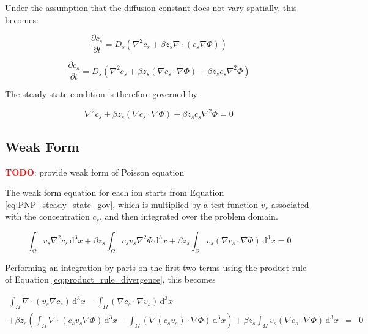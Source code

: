 Under the assumption that the diffusion constant does not vary spatially,
this becomes:

\begin{equation}
\frac{\partial c_s}{\partial t} = 
D_s \left( \nabla^2 c_s + \beta z_s \nabla \cdot \left( c_s \nabla \Phi \right) \right)
\end{equation}

\begin{equation}
\frac{\partial c_s}{\partial t} = 
D_s \left( \nabla^2 c_s + \beta z_s \left( \nabla c_s \cdot \nabla \Phi \right)  + \beta z_s c_s \nabla^2 \Phi \right)
\end{equation}

The steady-state condition is therefore governed by

\begin{equation}\label{eq:PNP_steady_state_gov}
\nabla^2 c_s + \beta z_s \left( \nabla c_s \cdot \nabla \Phi \right)  + \beta z_s c_s \nabla^2 \Phi = 0
\end{equation}


\subsection{Weak Form}\label{subsec:unhom_pnp_weak}

\textcolor{red}{\textbf{TODO}}: provide weak form of Poisson equation

The weak form equation for each ion starts from Equation \ref{eq:PNP_steady_state_gov},
which is multiplied by a test function $v_s$ associated with the concentration $c_s$,
and then integrated over the problem domain.

\begin{equation}
\int_\Omega v_s \nabla^2 c_s \,\mathrm{d}^3x 
+ \beta z_s \int_\Omega c_s v_s \nabla^2 \Phi \,\mathrm{d}^3x
+ \beta z_s \int_\Omega  v_s \left( \nabla c_s \cdot \nabla \Phi \right) \,\mathrm{d}^3x
= 0
\end{equation}

Performing an integration by parts on the first two terms
using the product rule of Equation \ref{eq:product_rule_divergence}, this becomes

\begin{equation}
\begin{aligned}
\int_\Omega \nabla \cdot \left( v_s \nabla c_s \right) \,\mathrm{d}^3x
- \int_\Omega \left( \nabla c_s \cdot \nabla v_s \right) \,\mathrm{d}^3x \\
+ \beta z_s \left( \int_\Omega \nabla \cdot \left( c_s v_s \nabla \Phi \right) \,\mathrm{d}^3x
- \int_\Omega \left( \nabla \left( c_s v_s \right)  \cdot \nabla \Phi \right) \,\mathrm{d}^3x \right) 
+ \beta z_s \int_\Omega  v_s \left( \nabla c_s \cdot \nabla \Phi \right) \,\mathrm{d}^3x
& = & 0
\end{aligned}
\end{equation}

